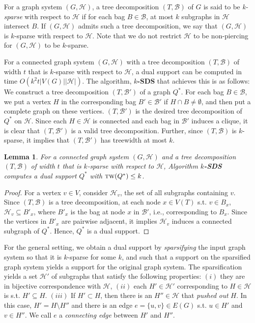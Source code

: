 \documentclass[12pt]{article}
\newcommand{\BB}{\mathcal{B}}
\newcommand{\HH}{\mathcal{H}}
\newcommand{\tw}{\textsc{tw}}
\newtheorem{lemma}[theorem]{Lemma}
\theoremstyle{case}
\begin{document}
For a graph system $(G,\mathcal{H})$, a tree decomposition
$(T,\mathcal{B})$ of $G$ is said to be \emph{k-sparse} with
respect to $\mathcal{H}$ if for each bag
$B\in \mathcal{B}$, at most $k$ subgraphs in $\HH$ intersect $B$.
If $(G,\mathcal{H})$ admits such a tree decomposition, 
we say that $(G,\mathcal{H})$ is $k$-sparse with respect to $\HH$. 
Note that we do not restrict $\mathcal{H}$ to be non-piercing for $(G,\HH)$ to be $k$-sparse.

For a connected graph system $(G,\mathcal{H})$
with a tree decomposition $(T,\mathcal{B})$ of width $t$ that is $k$-sparse 
with respect to $\mathcal{H}$,
a dual support can be computed in time 
$O(k^2 t|V(G)||\mathcal{H}|)$.
The algorithm, {\bf $k$-SDS} that achieves this is as follows:
We construct a tree decomposition $(T,\BB')$ of a graph $Q^*$.
For each bag $B\in\mathcal{B}$, we put a vertex $H$ in the corresponding bag $B'\in\BB'$ if $H\cap B\ne\emptyset$, 
and then put a complete graph on these vertices.
$(T,\mathcal{B}')$ is the desired
tree decomposition of $Q^*$ on $\mathcal{H}$. 
Since each $H\in\mathcal{H}$
is connected and each bag in $\BB'$ induces a clique, it is clear that $(T,\mathcal{B}')$ is a valid tree decomposition. 
Further, since $(T,\mathcal{B})$ is $k$-sparse, it implies that
$(T,\mathcal{B}')$ has treewidth at most $k$.

\begin{lemma}
\label{lem:easydual}
For a connected graph system $(G,\mathcal{H})$ and a tree decomposition
$(T,\mathcal{B})$ of width $t$ that is $k$-sparse with respect to $\mathcal{H}$,
Algorithm {\bf $k$-SDS} computes a dual support
$Q^*$ with $\tw(Q^*)\le k$.
\end{lemma}
\begin{proof}
For a vertex $v\in V$, consider $\mathcal{H}_v$, the set of all subgraphs containing $v$. 
Since $(T,\mathcal{B})$ is a tree decomposition, at each node $x\in V(T)$
s.t. $v\in B_x$, $\mathcal{H}_v\subseteq B'_x$, where $B'_x$ is the bag at node $x$ in $\mathcal{B}'$,
i.e., corresponding to $B_x$. Since the vertices in $B'_x$ are pairwise adjacent, it implies
$\mathcal{H}_v$ induces a connected subgraph of $Q^*$. Hence,
$Q^*$ is a dual support.
\end{proof}

For the general setting, we obtain a dual support by \emph{sparsifying} the input graph system
so that it is $k$-sparse for some $k$, and such that a support on the sparsified graph system yields a 
support for the original graph system.
The sparsification yields a set
$\mathcal{H}'$ of subgraphs that satisfy the following properties:
$(i)$ they are in bijective correspondence with $\mathcal{H}$,
$(ii)$ each $H'\in\mathcal{H}'$ corresponding to $H\in\mathcal{H}$ is s.t.
$H'\subseteq H$. $(iii)$ If $H'\subset H$, then there is an $H''\in\mathcal{H}$
that \emph{pushed out} $H$.
In this case, $H'=H\setminus H''$ and there is an edge $e=\{u,v\}\in E(G)$
s.t. $u\in H'$ and $v\in H''$. We call $e$ a
\emph{connecting edge} between $H'$ and $H''$.
\end{document}
